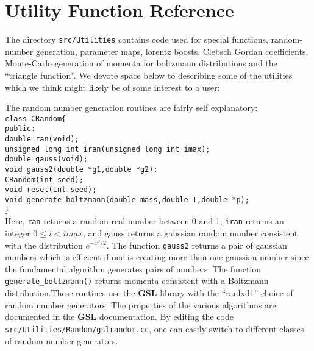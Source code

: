 \documentclass[10pt]{article}
\def\tab{\hspace*{9pt}}
\begin{document}
\section{Utility Function Reference}
\label{sec:utilities}

The directory {\tt src/Utilities} contains code used for special functions, random-number generation, parameter maps, lorentz boosts, Clebsch Gordan coefficients, Monte-Carlo generation of momenta for boltzmann distributions and the ``triangle function''. We devote space below to describing some of the utilities which we think might likely be of some interest to a user:

The random number generation routines are fairly self explanatory:\\
{\tt class CRandom\{\\
 public:\\
\tab double ran(void);\\
\tab unsigned long int iran(unsigned long int imax); \\
\tab double gauss(void);\\
\tab void gauss2(double *g1,double *g2);\\
\tab CRandom(int seed);\\
\tab void reset(int seed);\\
\tab void generate\_boltzmann(double mass,double T,double *p);\\
\}}\\
Here, {\tt ran} returns a random real number between 0 and 1, {\tt iran} returns an integer $0\le i <imax$, and gauss returns a gaussian random number consistent with the distribution $e^{-x^2/2}$. The function {\tt gauss2} returns a pair of gaussian numbers which is efficient if one is creating more than one gaussian number since the fundamental algorithm generates pairs of numbers. The function {\tt generate\_boltzmann()} returns momenta consistent with a Boltzmann distribution.These routines use the {\bf GSL} library with the ``ranlxd1'' choice of random number generators. The properties of the various algorithms are documented in the {\bf GSL} documentation. By editing the code {\tt src/Utilities/Random/gslrandom.cc}, one can easily switch to different classes of random number generators.
\end{document}
